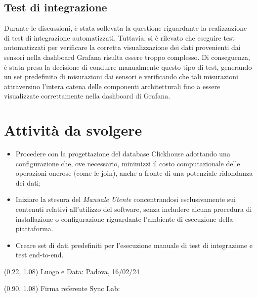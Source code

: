 \documentclass{article}
\begin{document}
    \subsection{Test di integrazione}
    Durante le discussioni, è stata sollevata la questione riguardante la realizzazione di test di integrazione automatizzati. Tuttavia, si è rilevato che eseguire test automatizzati per verificare la corretta visualizzazione dei dati provenienti dai sensori nella dashboard Grafana risulta essere troppo complesso. Di conseguenza, è stata presa la decisione di condurre manualmente questo tipo di test, generando un set predefinito di misurazioni dai sensori e verificando che tali misurazioni attraversino l'intera catena delle componenti architetturali fino a essere visualizzate correttamente nella dashboard di Grafana.

\section{Attività da svolgere}
    \begin{itemize}
        \item Procedere con la progettazione del database Clickhouse adottando una configurazione che, ove necessario, minimizzi il costo computazionale delle operazioni onerose (come le join), anche a fronte di una potenziale ridondanza dei dati;
        \item Iniziare la stesura del \textit{Manuale Utente} concentrandosi esclusivamente sui contenuti relativi all'utilizzo del software, senza includere alcuna procedura di installazione o configurazione riguardante l'ambiente di esecuzione della piattaforma.
        \item Creare set di dati predefiniti per l'esecuzione manuale di test di integrazione e test end-to-end.
    \end{itemize}




\begin{textblock*}{\textwidth}(0.22\textwidth, 1.08\textheight)
    Luogo e Data: Padova, 16/02/24
\end{textblock*}

\begin{textblock*}{\textwidth}(0.90\textwidth, 1.08\textheight)
        Firma referente Sync Lab:
\end{textblock*}
\end{document}
